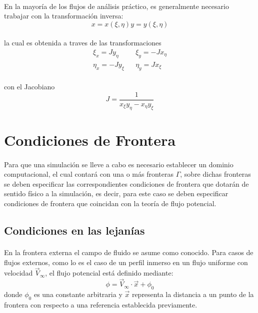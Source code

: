 \documentclass[letterpaper, openright, 12pt]{book}
\begin{document}
    \paragraph*{}
        En la mayoría de los flujos de análisis práctico, es generalmente
        necesario trabajar con la transformación inversa:
        \begin{subequations}
            \begin{equation}
                x = x \left( \xi, \eta \right)
            \end{equation}
            \begin{equation}
                y = y \left( \xi, \eta \right)
            \end{equation}
        \end{subequations}
    \\ la cual es obtenida a traves de las transformaciones
    \begin{align}
        \xi_{x} = J y_{\eta} && \xi_{y} = -J x_{\eta}
        \\
        \eta_{x} = -J y_{\xi} && \eta_{y} = J x_{\xi}
    \end{align}
    \\ con el Jacobiano
    \begin{equation}
        J = \frac{1}{x_{\xi} y_{\eta} - x_{\eta} y_{\xi}}
    \end{equation}

    \section{Condiciones de Frontera}
    \paragraph*{}
        Para que una simulación se lleve a cabo es necesario establecer un
        dominio computacional, el cual contará con una o más fronteras
        $\Gamma$, sobre dichas fronteras se deben especificar las
        correspondientes condiciones de frontera que dotarán de sentido físico
        a la simulación, es decir, para este caso se deben especificar
        condiciones de frontera que coincidan con la teoría de flujo potencial.

    \subsection{Condiciones en las lejanías}
    \paragraph*{}
        En la frontera externa el campo de fluido se asume como conocido. Para
        casos de flujos externos, como lo es el caso de un perfil inmerso en un
        flujo uniforme con velocidad $\vec{V}_{\infty}$, el flujo potencial
        está definido mediante:
        \begin{equation}
            \phi = \vec{V}_{\infty} \cdot \vec{x} + \phi_{0}
        \end{equation}
        donde $\phi_{0}$ es una constante arbitraria y $\vec{x}$ representa
        la distancia a un punto de la frontera con respecto a una referencia
        establecida previamente.
\end{document}
